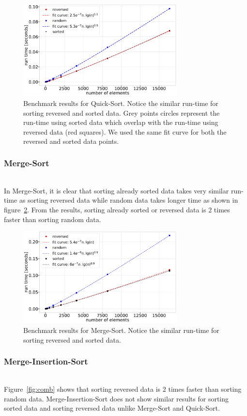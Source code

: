 \documentclass[sigconf, nonacm, natbib, screen, balance=False]{acmart}
\begin{document}
\begin{figure}
  \centering
  \includegraphics[width=84mm]{../figures/quick_sort.pdf}
  \caption{Benchmark results for Quick-Sort. Notice the similar run-time for sorting reversed and sorted data. Grey points circles represent the run-time using sorted data which overlap with the run-time using reversed data (red squares). We used the same fit curve for both the reversed and sorted data points.}
  \label{fig:quicksort}
\end{figure}

\subsubsection{Merge-Sort}\label{sec:merge}
\hfill\\
In Merge-Sort, it is clear that sorting already sorted data takes very similar run-time as sorting reversed data while random data takes longer time as shown in figure~\ref{fig:merge}. From the results, sorting already sorted or reversed data is $2$ times faster than sorting random data.

\begin{figure}
  \centering
  \includegraphics[width=84mm]{../figures/merge_sort.pdf}
  \caption{Benchmark results for Merge-Sort. Notice the similar run-time for sorting reversed and sorted data.}
  \label{fig:merge}
\end{figure}
\subsubsection{Merge-Insertion-Sort}\label{sec:combined}
\hfill\\
Figure~\ref{fig:comb} shows that sorting reversed data is $2$ times faster than sorting random data. Merge-Insertion-Sort does not show similar results for sorting sorted data and sorting reversed data unlike Merge-Sort and Quick-Sort. 
\end{document}
